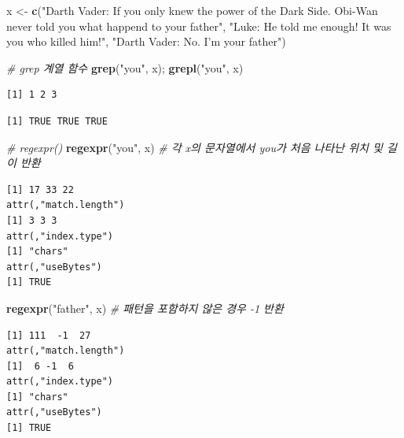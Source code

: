 \documentclass[
  11pt,
]{krantz}
\newenvironment{Shaded}{\begin{snugshade}}{\end{snugshade}}
\newcommand{\CommentTok}[1]{\textcolor[rgb]{0.37,0.37,0.37}{\textit{#1}}}
\newcommand{\KeywordTok}[1]{\textcolor[rgb]{0.27,0.27,0.27}{\textbf{#1}}}
\newcommand{\NormalTok}[1]{#1}
\newcommand{\StringTok}[1]{\textcolor[rgb]{0.5,0.5,0.5}{#1}}
\begin{document}
\footnotesize

\begin{Shaded}
\begin{Highlighting}[]
\NormalTok{x <-}\StringTok{ }\KeywordTok{c}\NormalTok{(}\StringTok{"Darth Vader: If you only knew the power of the Dark Side. }
\StringTok{       Obi-Wan never told you what happend to your father"}\NormalTok{, }
       \StringTok{"Luke: He told me enough! It was you who killed him!"}\NormalTok{, }
       \StringTok{"Darth Vader: No. I'm your father"}\NormalTok{)}

\CommentTok{# grep 계열 함수}
\KeywordTok{grep}\NormalTok{(}\StringTok{"you"}\NormalTok{, x); }\KeywordTok{grepl}\NormalTok{(}\StringTok{"you"}\NormalTok{, x)}
\end{Highlighting}
\end{Shaded}

\begin{verbatim}
[1] 1 2 3
\end{verbatim}

\begin{verbatim}
[1] TRUE TRUE TRUE
\end{verbatim}

\begin{Shaded}
\begin{Highlighting}[]
\CommentTok{# regexpr() }
\KeywordTok{regexpr}\NormalTok{(}\StringTok{"you"}\NormalTok{, x) }\CommentTok{# 각 x의 문자열에서 you가 처음 나타난 위치 및 길이 반환}
\end{Highlighting}
\end{Shaded}

\begin{verbatim}
[1] 17 33 22
attr(,"match.length")
[1] 3 3 3
attr(,"index.type")
[1] "chars"
attr(,"useBytes")
[1] TRUE
\end{verbatim}

\begin{Shaded}
\begin{Highlighting}[]
\KeywordTok{regexpr}\NormalTok{(}\StringTok{"father"}\NormalTok{, x) }\CommentTok{# 패턴을 포함하지 않은 경우 -1 반환}
\end{Highlighting}
\end{Shaded}

\begin{verbatim}
[1] 111  -1  27
attr(,"match.length")
[1]  6 -1  6
attr(,"index.type")
[1] "chars"
attr(,"useBytes")
[1] TRUE
\end{verbatim}

\normalsize
\end{document}
